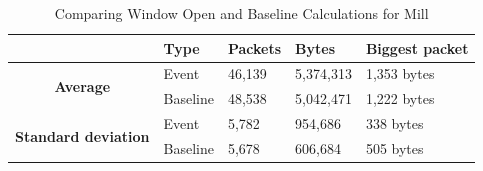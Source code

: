 \begin{table}[H]
    \centering
    \caption{Comparing Window Open and Baseline Calculations for Mill}
    \begin{tabular}{c|l|l|l|l|}
        \cline{2-5}
        \multicolumn{1}{l|}{}                                              & \textbf{Type} & \textbf{Packets} & \textbf{Bytes} & \textbf{Biggest packet} \\ \hline
        \multicolumn{1}{|c|}{\multirow{2}{*}{\textbf{Average}}}            & Event         & 46,139           & 5,374,313      & 1,353 bytes             \\ \cline{2-5} 
        \multicolumn{1}{|c|}{}                                             & Baseline      & 48,538           & 5,042,471      & 1,222 bytes              \\ \hline
        \multicolumn{1}{|c|}{\multirow{2}{*}{\textbf{Standard deviation}}} & Event         & 5,782            & 954,686        & 338 bytes              \\ \cline{2-5} 
        \multicolumn{1}{|c|}{}                                             & Baseline      & 5,678            & 606,684        & 505 bytes             \\ \hline          
    \end{tabular}
    \label{tab:MillComparingBaselineAndWindowCalculations}
\end{table}

